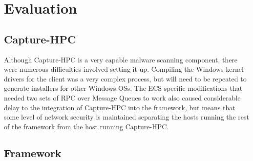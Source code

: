 \section{Evaluation}








\subsection{Capture-HPC}

Although Capture-HPC is a very capable malware scanning component, there were
numerous difficulties involved setting it up. Compiling the Windows kernel
drivers for the client was a very complex process, but will need to be repeated
to generate installers for other Windows OSs. The ECS specific modifications
that needed two sets of RPC over Message Queues to work also caused considerable
delay to the integration of Capture-HPC into the framework, but means that some
level of network security is maintained separating the hosts running the rest of
the framework from the host running Capture-HPC.

\subsection{Framework}


